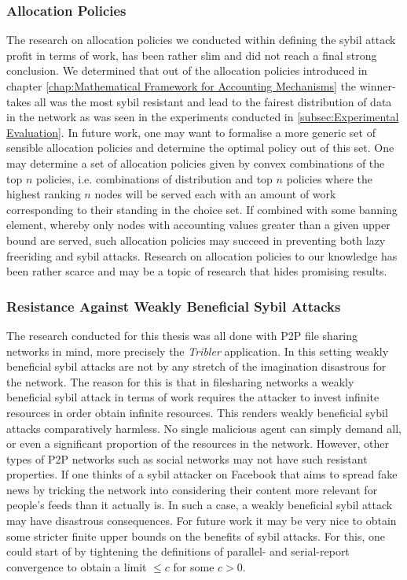 \subsubsection*{Allocation Policies}
\label{subsubsec:Allocation Policies}
\noindent{}The research on allocation policies we conducted within defining the sybil attack profit in terms of work, has been rather slim and  did not reach a final strong conclusion. We determined that out of the allocation policies introduced in chapter \ref{chap:Mathematical Framework for Accounting Mechanisms} the winner-takes all was the most sybil resistant and lead to the fairest distribution of data in the network as was seen in the experiments conducted in \ref{subsec:Experimental Evaluation}. In future work, one may want to formalise a more generic set of sensible allocation policies and determine the optimal policy out of this set. One may determine a set of allocation policies given by convex combinations of the top $n$ policies, i.e. combinations of distribution and top $n$ policies where the highest ranking $n$ nodes will be served each with an amount of work corresponding to their standing in the choice set. If combined with some banning element, whereby only nodes with accounting values greater than a given upper bound are served, such allocation policies may succeed in preventing both lazy freeriding and sybil attacks. Research on allocation policies to our knowledge has been rather scarce and may be a topic of research that hides promising results.\vspace{1em}\\

\subsubsection*{Resistance Against Weakly Beneficial Sybil Attacks}
\label{subsubsec:Resistance Against Weakly Beneficial Sybil Attacks}
\noindent{}The research conducted for this thesis was all done with P2P file sharing networks in mind, more precisely the {\it Tribler} application. In this setting weakly beneficial sybil attacks are not by any stretch of the imagination disastrous for the network. The reason for this is that in filesharing networks a weakly beneficial sybil attack in terms of work requires the attacker to invest infinite resources in order obtain infinite resources. This renders weakly beneficial sybil attacks comparatively harmless. No single malicious agent can simply demand all, or even a significant proportion of the resources in the network. However, other types of P2P networks such as social networks may not have such resistant properties. If one thinks of a sybil attacker on Facebook that aims to spread fake news by tricking the network into considering their content more relevant for people's feeds than it actually is. In such a case, a weakly beneficial sybil attack may have disastrous consequences. For future work it may be very nice to obtain some stricter finite upper bounds on the benefits of sybil attacks. For this, one could start of by tightening the definitions of parallel- and serial-report convergence to obtain a limit $\leq{}c$ for some $c>0$. \vspace{1em}\\


